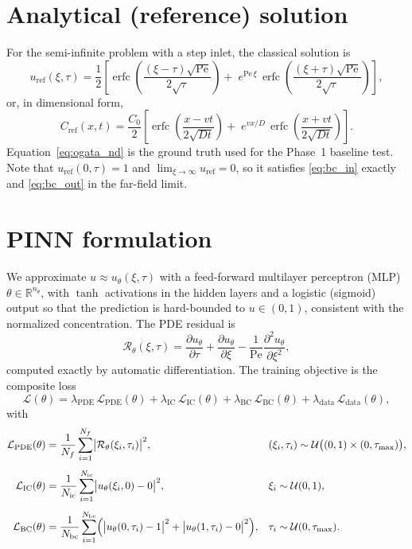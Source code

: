 \documentclass[11pt]{article}
\newcommand{\R}{\mathbb{R}}
\newcommand{\pdd}[2]{\frac{\partial #1}{\partial #2}}
\newcommand{\pddt}[2]{\frac{\partial^{2} #1}{\partial #2^{2}}}
\newcommand{\erfc}{\operatorname{erfc}}
\newcommand{\Lpde}{\mathcal{L}_{\mathrm{PDE}}}
\newcommand{\Lic}{\mathcal{L}_{\mathrm{IC}}}
\newcommand{\Lbc}{\mathcal{L}_{\mathrm{BC}}}
\newcommand{\Ldata}{\mathcal{L}_{\mathrm{data}}}
\begin{document}
\section{Analytical (reference) solution}
\label{sec:analytical}

For the semi-infinite problem with a step inlet, the classical solution
\citep{ogata1961solution} is
\begin{equation}
\label{eq:ogata_nd}
u_{\mathrm{ref}}(\xi,\tau)=
\frac{1}{2}\left[
\erfc\!\left(\frac{(\xi-\tau)\sqrt{\mathrm{Pe}}}{2\sqrt{\tau}}\right)
+\;e^{\mathrm{Pe}\,\xi}\,
\erfc\!\left(\frac{(\xi+\tau)\sqrt{\mathrm{Pe}}}{2\sqrt{\tau}}\right)
\right],
\end{equation}
or, in dimensional form,
\begin{equation}
\label{eq:ogata_dim}
C_{\mathrm{ref}}(x,t)=
\frac{C_0}{2}\left[
\erfc\!\left(\frac{x-vt}{2\sqrt{Dt}}\right)
+\;e^{vx/D}\,
\erfc\!\left(\frac{x+vt}{2\sqrt{Dt}}\right)
\right].
\end{equation}
Equation~\eqref{eq:ogata_nd} is the ground truth used for the Phase~1 baseline
test. Note that $u_{\mathrm{ref}}(0,\tau)=1$ and
$\lim_{\xi\to\infty}u_{\mathrm{ref}}=0$, so it satisfies
\eqref{eq:bc_in} exactly and \eqref{eq:bc_out} in the far-field limit.

\section{PINN formulation}
\label{sec:pinn}

We approximate $u\approx u_\theta(\xi,\tau)$ with a feed-forward multilayer
perceptron (MLP) $\theta\in\R^{n_\theta}$, with $\tanh$ activations in the hidden
layers and a logistic (sigmoid) output so that the prediction is hard-bounded to
$u\in(0,1)$, consistent with the normalized concentration. The PDE residual is
\begin{equation}
\label{eq:residual}
\mathcal{R}_\theta(\xi,\tau)
=\pdd{u_\theta}{\tau}+\pdd{u_\theta}{\xi}
-\frac{1}{\mathrm{Pe}}\pddt{u_\theta}{\xi},
\end{equation}
computed exactly by automatic differentiation. The training objective is the
composite loss
\begin{equation}
\label{eq:loss}
\mathcal{L}(\theta)=
\lambda_{\mathrm{PDE}}\,\Lpde(\theta)
+\lambda_{\mathrm{IC}}\,\Lic(\theta)
+\lambda_{\mathrm{BC}}\,\Lbc(\theta)
+\lambda_{\mathrm{data}}\,\Ldata(\theta),
\end{equation}
with
\begin{align}
\Lpde(\theta)&=\frac{1}{N_f}\sum_{i=1}^{N_f}
\bigl|\mathcal{R}_\theta(\xi_i,\tau_i)\bigr|^{2},
&&(\xi_i,\tau_i)\sim\mathcal{U}\bigl((0,1)\times(0,\tau_{\max})\bigr),
\label{eq:Lpde}\\[4pt]
\Lic(\theta)&=\frac{1}{N_{\mathrm{ic}}}\sum_{i=1}^{N_{\mathrm{ic}}}
\bigl|u_\theta(\xi_i,0)-0\bigr|^{2},
&&\xi_i\sim\mathcal{U}(0,1),
\label{eq:Lic}\\[4pt]
\Lbc(\theta)&=\frac{1}{N_{\mathrm{bc}}}\sum_{i=1}^{N_{\mathrm{bc}}}
\Bigl(\bigl|u_\theta(0,\tau_i)-1\bigr|^{2}
+\bigl|u_\theta(1,\tau_i)-0\bigr|^{2}\Bigr),
&&\tau_i\sim\mathcal{U}(0,\tau_{\max}).
\label{eq:Lbc}
\end{align}
\end{document}
